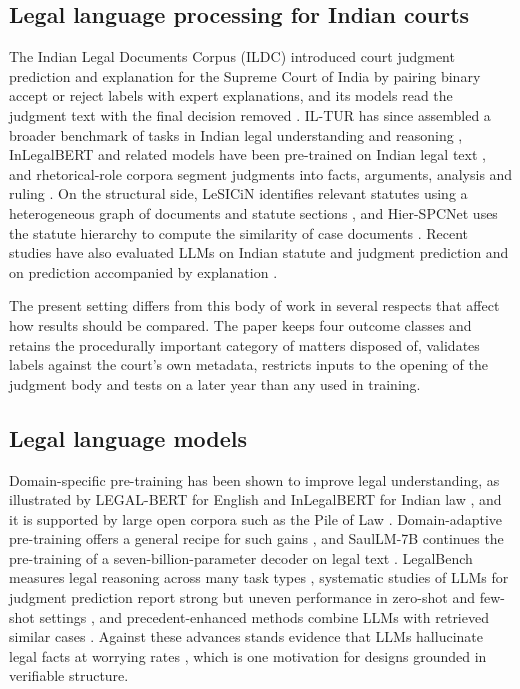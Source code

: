 \documentclass[journal]{IEEEtran}
\begin{document}
\subsection{Legal language processing for Indian courts}
The Indian Legal Documents Corpus (ILDC) introduced court judgment prediction and explanation for the Supreme Court of India by pairing binary accept or reject labels with expert explanations, and its models read the judgment text with the final decision removed \cite{r10}. IL-TUR has since assembled a broader benchmark of tasks in Indian legal understanding and reasoning \cite{r11}, InLegalBERT and related models have been pre-trained on Indian legal text \cite{r12}, and rhetorical-role corpora segment judgments into facts, arguments, analysis and ruling \cite{r41}. On the structural side, LeSICiN identifies relevant statutes using a heterogeneous graph of documents and statute sections \cite{r16}, and Hier-SPCNet uses the statute hierarchy to compute the similarity of case documents \cite{r17}. Recent studies have also evaluated LLMs on Indian statute and judgment prediction \cite{r42} and on prediction accompanied by explanation \cite{r43}.

The present setting differs from this body of work in several respects that affect how results should be compared. The paper keeps four outcome classes and retains the procedurally important category of matters disposed of, validates labels against the court's own metadata, restricts inputs to the opening of the judgment body and tests on a later year than any used in training.

\subsection{Legal language models}
Domain-specific pre-training has been shown to improve legal understanding, as illustrated by LEGAL-BERT for English \cite{r44} and InLegalBERT for Indian law \cite{r12}, and it is supported by large open corpora such as the Pile of Law \cite{r45}. Domain-adaptive pre-training offers a general recipe for such gains \cite{r46}, and SaulLM-7B continues the pre-training of a seven-billion-parameter decoder on legal text \cite{r47}. LegalBench measures legal reasoning across many task types \cite{r48}, systematic studies of LLMs for judgment prediction report strong but uneven performance in zero-shot and few-shot settings \cite{r49}, and precedent-enhanced methods combine LLMs with retrieved similar cases \cite{r50}. Against these advances stands evidence that LLMs hallucinate legal facts at worrying rates \cite{r51}, which is one motivation for designs grounded in verifiable structure.
\end{document}
